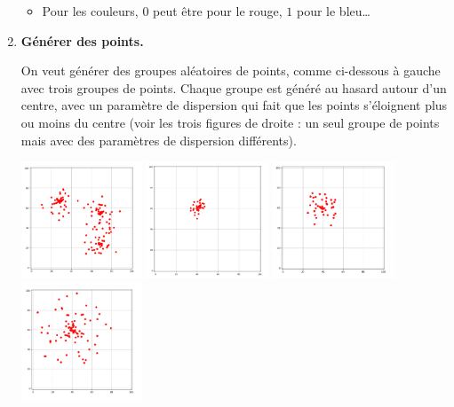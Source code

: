 \documentclass[11pt,class=report,crop=false]{standalone}
\begin{document}
\begin{activite}[Barycentres]
\begin{enumerate}
\begin{itemize}
		\item Pour les couleurs, $0$ peut être pour le rouge, $1$ pour le bleu\ldots
	\end{itemize}

	\item \textbf{Générer des points.}
	
	On veut générer des groupes aléatoires de points, comme ci-dessous à gauche avec trois groupes de points. Chaque groupe est généré au hasard autour d'un centre, avec un paramètre de dispersion qui fait que les points s'éloignent plus ou moins du centre (voir les trois figures de droite : un seul groupe de points mais avec des paramètres de dispersion différents).
	
	\begin{center}
		\includegraphics[scale=\myscale,height=3.5cm]{ecran-barycentres-2}
		\includegraphics[scale=\myscale,height=3.5cm]{ecran-barycentres-3a}
		\includegraphics[scale=\myscale,height=3.5cm]{ecran-barycentres-3b}
		\includegraphics[scale=\myscale,height=3.5cm]{ecran-barycentres-3c}
	\end{center}
	

\end{enumerate}
\end{activite}
\end{document}

